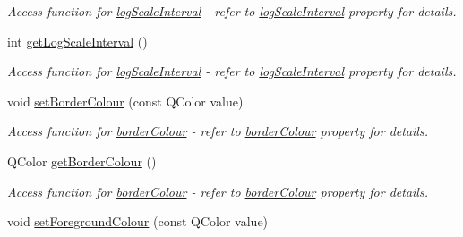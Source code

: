 \begin{DoxyCompactItemize}
\begin{DoxyCompactList}\small\item\em Access function for \hyperlink{classQEAnalogIndicator_a7ca36f10b9a6b449aa8acbe754d5e4c3}{logScaleInterval} -\/ refer to \hyperlink{classQEAnalogIndicator_a7ca36f10b9a6b449aa8acbe754d5e4c3}{logScaleInterval} property for details. \end{DoxyCompactList}\item 
\hypertarget{classQEAnalogIndicator_af287bc68004ec40934bc6dec695ceea6}{
int \hyperlink{classQEAnalogIndicator_af287bc68004ec40934bc6dec695ceea6}{getLogScaleInterval} ()}
\label{classQEAnalogIndicator_af287bc68004ec40934bc6dec695ceea6}

\begin{DoxyCompactList}\small\item\em Access function for \hyperlink{classQEAnalogIndicator_a7ca36f10b9a6b449aa8acbe754d5e4c3}{logScaleInterval} -\/ refer to \hyperlink{classQEAnalogIndicator_a7ca36f10b9a6b449aa8acbe754d5e4c3}{logScaleInterval} property for details. \end{DoxyCompactList}\item 
\hypertarget{classQEAnalogIndicator_a8d624591946c8dcb2fcdbcb86cc9c563}{
void \hyperlink{classQEAnalogIndicator_a8d624591946c8dcb2fcdbcb86cc9c563}{setBorderColour} (const QColor value)}
\label{classQEAnalogIndicator_a8d624591946c8dcb2fcdbcb86cc9c563}

\begin{DoxyCompactList}\small\item\em Access function for \hyperlink{classQEAnalogIndicator_a001418f50a836dae0cf488dceae6ce0d}{borderColour} -\/ refer to \hyperlink{classQEAnalogIndicator_a001418f50a836dae0cf488dceae6ce0d}{borderColour} property for details. \end{DoxyCompactList}\item 
\hypertarget{classQEAnalogIndicator_ade765bd4ce696220601550ceadcb9070}{
QColor \hyperlink{classQEAnalogIndicator_ade765bd4ce696220601550ceadcb9070}{getBorderColour} ()}
\label{classQEAnalogIndicator_ade765bd4ce696220601550ceadcb9070}

\begin{DoxyCompactList}\small\item\em Access function for \hyperlink{classQEAnalogIndicator_a001418f50a836dae0cf488dceae6ce0d}{borderColour} -\/ refer to \hyperlink{classQEAnalogIndicator_a001418f50a836dae0cf488dceae6ce0d}{borderColour} property for details. \end{DoxyCompactList}\item 
\hypertarget{classQEAnalogIndicator_a69eac13a9ccc7c63c649eea9a2f7b96a}{
void \hyperlink{classQEAnalogIndicator_a69eac13a9ccc7c63c649eea9a2f7b96a}{setForegroundColour} (const QColor value)}
\label{classQEAnalogIndicator_a69eac13a9ccc7c63c649eea9a2f7b96a}


\end{DoxyCompactItemize}
